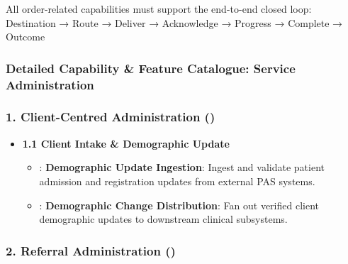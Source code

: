 All order-related capabilities must support the end-to-end closed loop: Destination → Route → Deliver → Acknowledge → Progress → Complete → Outcome

\label{rad:enabling:275}

\par\smallskip
{}\label{rad:enabling:277}
\subsubsection*{Detailed Capability \& Feature Catalogue: Service Administration}
\label{rad:enabling:279}
\subsubsection*{1. Client-Centred Administration (\texttt{})}
\label{rad:enabling:280}

\begin{itemize}

\item 
\textbf{1.1 Client Intake \& Demographic Update}


\begin{itemize}

\item 
\texttt{}: \textbf{Demographic Update Ingestion}: Ingest and validate patient admission and registration updates from external PAS systems.



\item 
\texttt{}: \textbf{Demographic Change Distribution}: Fan out verified client demographic updates to downstream clinical subsystems.



\end{itemize}


\end{itemize}
\label{rad:enabling:284}
\subsubsection*{2. Referral Administration (\texttt{})}
\label{rad:enabling:285}

